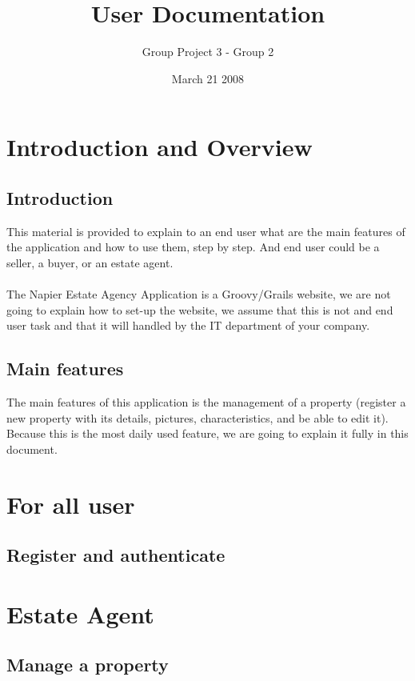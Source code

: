 \documentclass[a4paper,12pt]{article}
\title{User Documentation}
\author{Group Project 3 - Group 2}
\date{March 21 2008}
\begin{document}
\maketitle
\newpage
\tableofcontents
\newpage



\section{Introduction and Overview}
\subsection{Introduction}
This material is provided to explain to an end user what are the main features of the application and how to use them, step by step.
And end user could be a seller, a buyer, or an estate agent.

\paragraph{}
The Napier Estate Agency Application is a Groovy/Grails website, we are not going to explain how to set-up the website, 
we assume that this is not and end user task and that it will handled by the IT department of your company.

\subsection{Main features}
The main features of this application is the management of a property (register a new property with its details, pictures, characteristics, and be able to edit it).
Because this is the most daily used feature, we are going to explain it fully in this document.

\section{For all user}
\subsection{Register and authenticate}

\section{Estate Agent}
\subsection{Manage a property}
\end{document}
